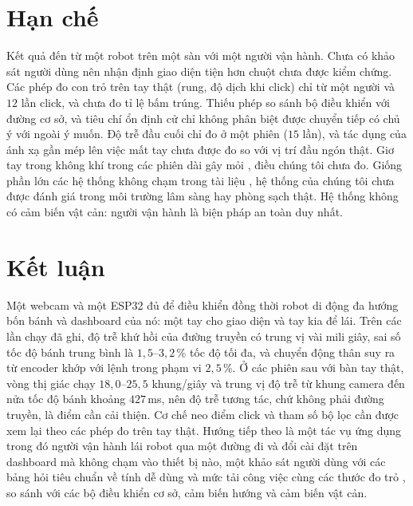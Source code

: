 \documentclass[5p,twocolumn]{elsarticle}
\begin{document}
\section{Hạn chế}\label{sec:limits}
Kết quả đến từ một robot trên một sàn với một người vận hành. Chưa có khảo sát người dùng nên nhận định giao diện tiện hơn chuột chưa được kiểm chứng. Các phép đo con trỏ trên tay thật (rung, độ dịch khi click) chỉ từ một người và $12$ lần click, và chưa đo tỉ lệ bấm trúng. Thiếu phép so sánh bộ điều khiển với đường cơ sở, và tiêu chí ổn định cử chỉ không phân biệt được chuyển tiếp có chủ ý với ngoài ý muốn. Độ trễ đầu cuối chỉ đo ở một phiên ($15$ lần), và tác dụng của ánh xạ gần mép lên việc mất tay chưa được đo so với vị trí đầu ngón thật. Giơ tay trong không khí trong các phiên dài gây mỏi \cite{hincapie2014}, điều chúng tôi chưa đo. Giống phần lớn các hệ thống không chạm trong tài liệu \cite{mewes2017}, hệ thống của chúng tôi chưa được đánh giá trong môi trường lâm sàng hay phòng sạch thật. Hệ thống không có cảm biến vật cản: người vận hành là biện pháp an toàn duy nhất.

\section{Kết luận}\label{sec:conclusion}
Một webcam và một ESP32 đủ để điều khiển đồng thời robot di động đa hướng bốn bánh và dashboard của nó: một tay cho giao diện và tay kia để lái. Trên các lần chạy đã ghi, độ trễ khứ hồi của đường truyền có trung vị vài mili giây, sai số tốc độ bánh trung bình là $1{,}5$--$3{,}2$\,\% tốc độ tối đa, và chuyển động thân suy ra từ encoder khớp với lệnh trong phạm vi $2{,}5$\,\%. Ở các phiên sau với bàn tay thật, vòng thị giác chạy $18{,}0$--$25{,}5$ khung/giây và trung vị độ trễ từ khung camera đến nửa tốc độ bánh khoảng $427$\,ms, nên độ trễ tương tác, chứ không phải đường truyền, là điểm cần cải thiện. Cơ chế neo điểm click và tham số bộ lọc cần được xem lại theo các phép đo trên tay thật. Hướng tiếp theo là một tác vụ ứng dụng trong đó người vận hành lái robot qua một đường đi và đổi cài đặt trên dashboard mà không chạm vào thiết bị nào, một khảo sát người dùng với các bảng hỏi tiêu chuẩn về tính dễ dùng và mức tải công việc \cite{brooke1996,hart1988} cùng các thước đo trỏ \cite{mackenzie1992}, so sánh với các bộ điều khiển cơ sở, cảm biến hướng và cảm biến vật cản.
\end{document}
